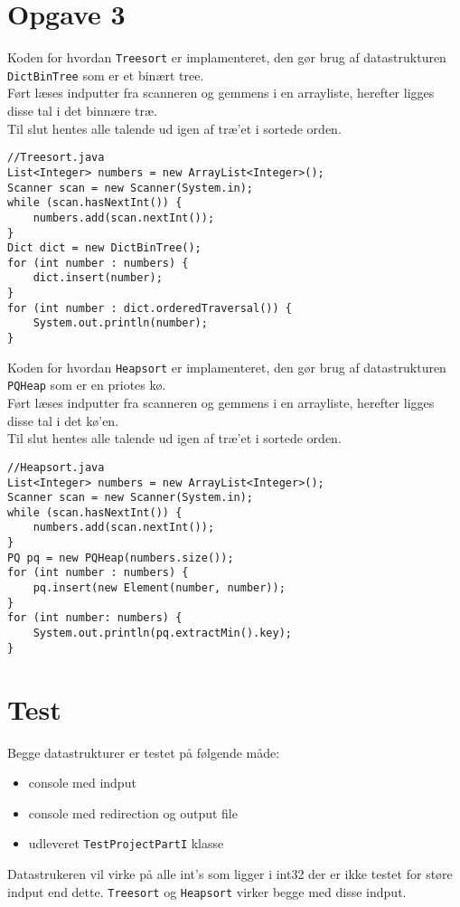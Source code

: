 \documentclass{article}
\begin{document}
\section*{Opgave 3}
Koden for hvordan \texttt{Treesort} er implamenteret, den gør brug af datastrukturen \texttt{DictBinTree} som er et binært tree.\\
Ført læses indputter fra scanneren og gemmens i en arrayliste, herefter ligges disse tal i det binnære træ.\\
Til slut hentes alle talende ud igen af træ'et i sortede orden.
\begin{lstlisting}
//Treesort.java
List<Integer> numbers = new ArrayList<Integer>();
Scanner scan = new Scanner(System.in);
while (scan.hasNextInt()) {
	numbers.add(scan.nextInt());
}
Dict dict = new DictBinTree();
for (int number : numbers) {
	dict.insert(number);
}
for (int number : dict.orderedTraversal()) {
	System.out.println(number);
}
\end{lstlisting}
Koden for hvordan \texttt{Heapsort} er implamenteret, den gør brug af datastrukturen \texttt{PQHeap} som er en priotes kø.\\
Ført læses indputter fra scanneren og gemmens i en arrayliste, herefter ligges disse tal i det kø'en.\\
Til slut hentes alle talende ud igen af træ'et i sortede orden.
\begin{lstlisting}
//Heapsort.java
List<Integer> numbers = new ArrayList<Integer>();
Scanner scan = new Scanner(System.in);
while (scan.hasNextInt()) {
	numbers.add(scan.nextInt());
}
PQ pq = new PQHeap(numbers.size());
for (int number : numbers) {
	pq.insert(new Element(number, number));
}
for (int number: numbers) {
	System.out.println(pq.extractMin().key);
}
\end{lstlisting}
\newpage
\section*{Test}
Begge datastrukturer er testet på følgende måde:
\begin{itemize}
  \item console med indput
  \item console med redirection og output file  
  \item udleveret \texttt{TestProjectPartI} klasse
\end{itemize}
\bigskip
Datastrukeren vil virke på alle int's som ligger i int32 der er ikke testet for støre indput end dette. \texttt{Treesort} og \texttt{Heapsort} virker begge med disse indput.
\end{document}
